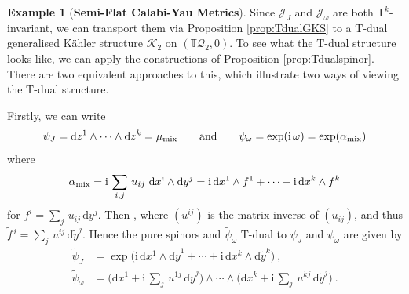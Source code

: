 \documentclass[a4paper, reqno, 11pt]{amsart}
\numberwithin{equation}{section}
\theoremstyle{definition}
\newtheorem{example}[equation]{Example}
\newcommand{\de}{\mathrm{d}}
\newcommand{\ii}{\mathrm{i}}
\newcommand{\IT}{\mathbb{T}}
\newcommand{\cQ}{{\mathcal Q}}
\newcommand{\cK}{{\mathcal K}}
\newcommand{\cJ}{{\mathcal J}}
\newcommand{\sfT}{{\mathsf{T}}}
\theoremstyle{remark}
\begin{document}
\begin{example}[\textbf{Semi-Flat Calabi-Yau Metrics}]
    Since $\cJ_J$ and $\cJ_\omega$ are both $\sfT^k$-invariant, we can transport them via Proposition \ref{prop:TdualGKS} to a T-dual generalised K\"ahler structure $\cK_2$ on $(\IT\cQ_2,0)$. To see what the T-dual structure looks like, we can apply the constructions of Proposition \ref{prop:Tdualspinor}. There are two equivalent approaches to this, which illustrate two ways of viewing the T-dual structure.
    
    Firstly, we can write
    \begin{align}
        \psi_J = \de z^1 \wedge \cdots \wedge \de z^k = \mu_{\rm mix} \qquad \text{and} \qquad
        \psi_\omega = \exp(\ii\,\omega)= \exp(\alpha_{\rm mix})
    \end{align}
    where
    \begin{align}
        \alpha_{\rm mix} = \ii\,\sum_{i,j}\, u_{ij}\ \de x^i \wedge \de y^j = \ii\,\de x^1 \wedge f^1 +\cdots + \ii\,\de x^k \wedge f^k
    \end{align}
    for $f^i = \sum_j\,u_{ij}\, \de y^j$. Then , where $(u^{ij})$ is the matrix inverse of $(u_{ij})$, and thus $\widetilde f{}^{\,i} = \sum_j\,u^{ij}\,\de \tilde y^j$. 
    Hence the pure spinors  and $\tilde \psi_\omega$ T-dual to $\psi_J$ and $\psi_\omega$ are given by
    \begin{align}
        \tilde \psi_J &= \exp\big(\ii\, \de x^1 \wedge \de \tilde y^1 +\cdots + \ii\,\de x^k \wedge \de \tilde y^k\big) \ , \\[4pt]
        \tilde \psi_{\omega} &=\Big(\de x^1 + \ii\,\sum_j\,u^{1j}\, \de \tilde y^j\Big)\wedge \cdots \wedge \Big(\de x^k + \ii\, \sum_j\,u^{kj}\, \de \tilde y^j\Big) \ .
    \end{align}
    

\end{example}
\end{document}
